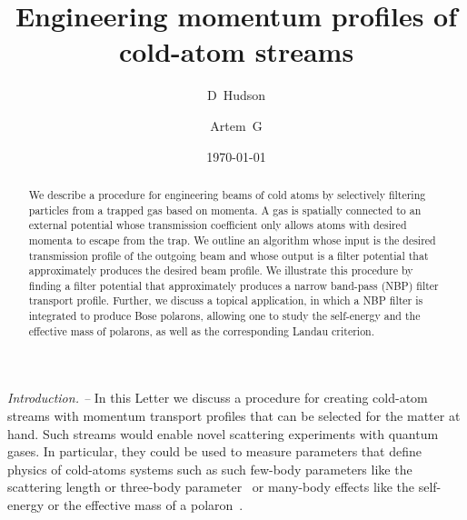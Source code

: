 \documentclass[twocolumn,amsmath,amssymb,showpacs,prl,superscriptaddress,aps]{revtex4-1}
\begin{document}
\title{Engineering momentum profiles of cold-atom {\color{blue} streams}}

\author{D~Hudson }

\author{Artem~G }


\date{\today}

\begin{abstract}
We describe a procedure for engineering beams of cold atoms by selectively filtering particles from a trapped gas based on momenta.
A gas is spatially connected to an external potential whose transmission coefficient only allows atoms with desired momenta to escape from the trap. We outline an algorithm whose input is the desired
transmission profile of the outgoing beam and whose output is a filter potential that approximately produces the desired beam profile. We illustrate this procedure by finding a filter potential that approximately produces a narrow band-pass (NBP) filter transport profile.
Further, we discuss a topical application, in which a NBP filter is integrated to produce Bose polarons, allowing one to study the self-energy and the effective mass of polarons, as well as the corresponding Landau criterion.
\end{abstract}


\maketitle



{\it Introduction. --}   
In this Letter we discuss a procedure for creating cold-atom streams with momentum transport profiles that can be selected for the matter at hand.
Such streams would enable novel scattering experiments with quantum gases. In particular, 
they could be used to measure parameters that define
physics of cold-atoms systems such as such few-body parameters like the
scattering length or three-body parameter~\cite{braaten2006, bloch2008} or
many-body effects like the self-energy or the effective mass of a polaron~\cite{massignan2014, schmidt2018}.
\end{document}
